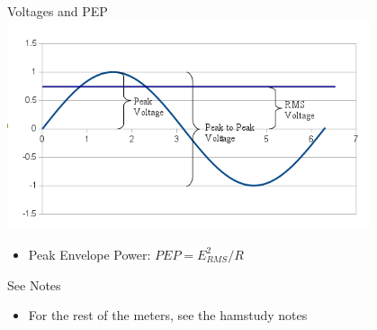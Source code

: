 \documentclass{beamer}
\begin{document}
\begin{frame}{Voltages and PEP}{}
\includegraphics[width=0.8\textwidth]{images/peak2peak.png}
\begin{itemize}
\item Peak Envelope Power: $PEP=E_{RMS}^2/R$
\end{itemize}

\end{frame}

\begin{frame}{See Notes}{}
\begin{itemize}
\item For the rest of the meters, see the hamstudy notes
\end{itemize}

\end{frame}




\end{document}
